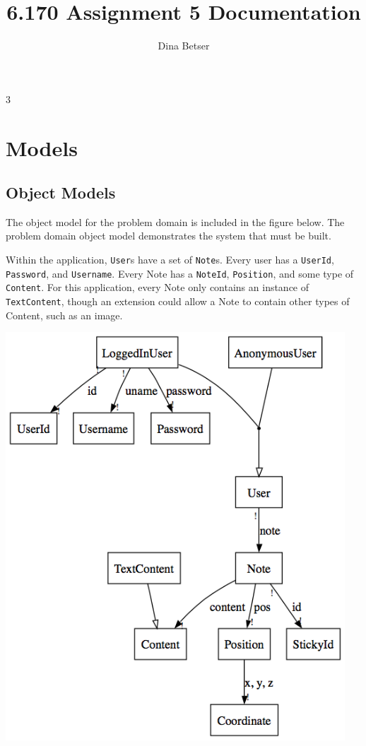 3\documentclass[11pt,letterpaper]{article}
\title{6.170 Assignment 5 Documentation}
\author{Dina Betser}
\begin{document}
\maketitle

\section{Models}
\subsection{Object Models}
The object model for the problem domain is included in the figure below. The problem domain object model demonstrates the system that must be built. 

Within the application, \texttt{User}s have a set of \texttt{Note}s. Every user has a \texttt{UserId}, \texttt{Password}, and \texttt{Username}.  Every Note has a \texttt{NoteId}, \texttt{Position}, and some type of \texttt{Content}. For this application, every Note only contains an instance of \texttt{TextContent}, though an extension could allow a Note to contain other types of Content, such as an image.
\begin{center}
\includegraphics[width=5in]{dot/obmod.png}
\label{fig:ob1} 
\end{center}
\end{document}
